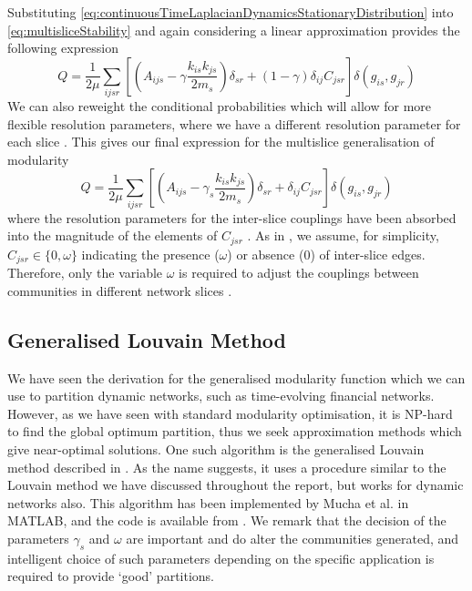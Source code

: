 Substituting \cref{eq:continuousTimeLaplacianDynamicsStationaryDistribution} into \cref{eq:multisliceStability} and again considering a linear approximation provides the following expression
\begin{equation}
	\label{eq:multisliceModularity}
	Q = \frac{1}{2\mu} \sum_{ijsr} \left[ \left( A_{ijs} - \gamma \frac{k_{is}k_{js}}{2m_{s}} \right) \delta_{sr} + (1-\gamma) \delta_{ij} C_{jsr} \right] \delta(g_{is},g_{jr})
\end{equation}
We can also reweight the conditional probabilities which will allow for more flexible resolution parameters, where we have a different resolution parameter for each slice \cite{MRM+10}.
This gives our final expression for the multislice generalisation of modularity
\begin{equation}
	\label{eq:multisliceModularityReweighted}
	Q = \frac{1}{2\mu} \sum_{ijsr} \left[ \left( A_{ijs} - \gamma_{s} \frac{k_{is}k_{js}}{2m_{s}} \right) \delta_{sr} + \delta_{ij} C_{jsr} \right] \delta(g_{is},g_{jr})
\end{equation}
where the resolution parameters for the inter-slice couplings have been absorbed into the magnitude of the elements of $C_{jsr}$ \cite{MRM+10}.
As in \cite{MRM+10}, we assume, for simplicity, $C_{jsr} \in \{ 0,\omega \}$ indicating the presence ($\omega$) or absence (0) of inter-slice edges.
Therefore, only the variable $\omega$ is required to adjust the couplings between communities in different network slices \cite{BPW+13}.


\subsection{Generalised Louvain Method}
\label{subsec:generalisedLouvainMethod}

We have seen the derivation for the generalised modularity function which we can use to partition dynamic networks, such as time-evolving financial networks.
However, as we have seen with standard modularity optimisation, it is NP-hard to find the global optimum partition, thus we seek approximation methods which give near-optimal solutions.
One such algorithm is the generalised Louvain method described in \cite{MRM+10,MFF+11}.
As the name suggests, it uses a procedure similar to the Louvain method we have discussed throughout the report, but works for dynamic networks also.
This algorithm has been implemented by Mucha et al. in MATLAB, and the code is available from \cite{GenLou}.
We remark that the decision of the parameters $\gamma_{s}$ and $\omega$ are important and do alter the communities generated, and intelligent choice of such parameters depending on the specific application is required to provide `good' partitions.

